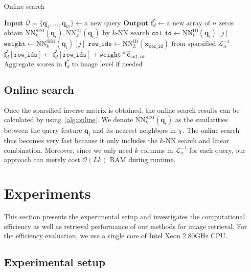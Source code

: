 \documentclass[letterpaper]{article} \usepackage{aaai19}  \usepackage{times}  \usepackage{helvet}  \usepackage{courier}  \usepackage{url}  \usepackage{graphicx}  \frenchspacing  \setlength{\pdfpagewidth}{8.5in}  \setlength{\pdfpageheight}{11in}
\begin{document}
\begin{algorithm}[t]
\caption{Online search}
\label{alg:online}
\begin{algorithmic}[1]
\State $\textbf{Input } \mathcal{Q} = \{ \mathbf{q}_1,\dots,\mathbf{q}_m \} \gets \text{a new query}$
\State $\textbf{Output } \mathbf{f}_d^* \gets \text{a new array of } n \text{ zeros}$
\State $\textrm{obtain } \textrm{NN}^{\textrm{SIM}}_k(\mathbf{q}_i), \textrm{NN}^{\textrm{ID}}_k(\mathbf{q}_i)  \text{ by $k$-NN search}$
\State $\mathtt{col\_id} \gets \textrm{NN}^{\textrm{ID}}_k(\mathbf{q}_i)[j]$
\State $\mathtt{weight} \gets \textrm{NN}^{\textrm{SIM}}_k(\mathbf{q}_i)[j]$
\State $\mathtt{row\_ids} \gets \textrm{NN}^{\textrm{ID}}_L(\mathbf{x}_\mathtt{col\_id}) \text{ from sparsified } \mathcal{L}_\alpha^{-1}$
\State $\mathbf{f}_d^*[\mathtt{row\_ids}] \gets \mathbf{f}_d^*[\mathtt{row\_ids}] + \mathtt{weight} * \hat{\mathbf{c}}_{\mathtt{col\_id}}$
\EndFor
\EndFor
\State $\text{Aggregate scores in } \mathbf{f}_d^* \text{ to image level if needed}$
\end{algorithmic}
\end{algorithm}

\subsection{Online search}

Once the sparsified inverse matrix is obtained, the online search results can be calculated by using~\cref{alg:online}.
We denote $\textrm{NN}_k^{\textrm{SIM}}(\mathbf{q}_i)$ as the similarities between the query feature $\mathbf{q}_i$ and its nearest neighbors in $\chi$.
The online search thus becomes very fast because it only includes the $k$-NN search and linear combination.
Moreover, since we only need $k$ columns in $\mathcal{L}_\alpha^{-1}$ for each query, our approach can merely cost $\mathcal{O}(Lk)$ RAM during runtime.


\section{Experiments}

This section presents the experimental setup and investigates the computational efficiency as well as retrieval performance of our methods for image retrieval.
For the efficiency evaluation, we use a single core of Intel Xeon 2.80GHz CPU.

\subsection{Experimental setup}
\end{document}
